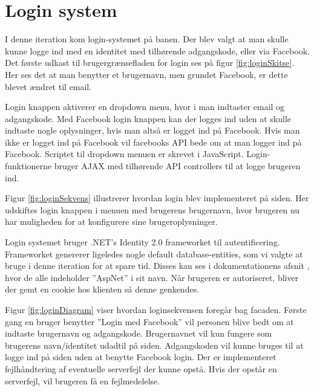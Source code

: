 \section{Login system}
\label{sec:LoginIT2}

I denne iteration kom login-systemet på banen. Der blev valgt at man skulle kunne logge ind med en identitet med tilhørende adgangskode, eller via Facebook. Det første udkast til brugergrænsefladen for login ses på figur \ref{fig:loginSkitse}. Her ses det at man benytter et brugernavn, men grundet Facebook, er dette blevet ændret til email.


Login knappen aktiverer en dropdown menu, hvor i man indtaster email og adgangskode. Med Facebook login knappen kan der logges ind uden at skulle indtaste nogle oplysninger, hvis man altså er logget ind på Facebook. Hvis man ikke er logget ind på Facebook vil facebooks API bede om at man logger ind på Facebook. Scriptet til dropdown menuen er skrevet i JavaScript. Login-funktionerne bruger AJAX med tilhørende API controllers til at logge brugeren ind.


Figur \ref{fig:loginSekvens} illustrerer hvordan login blev implementeret på siden. Her udskiftes login knappen i menuen med brugerens brugernavn, hvor brugeren nu har muligheden for at konfigurere sine brugeroplysninger. 

Login systemet bruger .NET's Identity 2.0 frameworket til autentificering. Frameworket genererer ligeledes nogle default database-entities, som vi valgte at bruge i denne iteration for at spare tid. Disses kan ses i dokumentationens afsnit , hvor de alle indeholder ''AspNet'' i sit navn.  Når brugeren er autoriseret, bliver der gemt en cookie hos klienten så denne genkendes.


Figur \ref{fig:loginDiagram} viser hvordan loginsekvensen foregår bag facaden. Første gang en bruger benytter ''Login med Facebook'' vil personen blive bedt om at indtaste brugernavn og adgangskode. Brugernavnet vil kun fungere som brugerens navn/identitet udadtil på siden. Adgangskoden vil kunne bruges til at logge ind på siden uden at benytte Facebook login. Der er implementeret fejlhåndtering af eventuelle serverfejl der kunne opstå. Hvis der opstår en serverfejl, vil brugeren få en fejlmedelelse.

